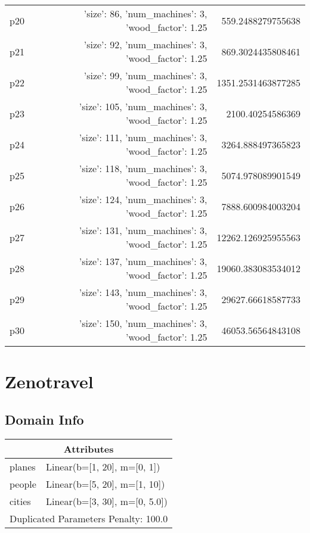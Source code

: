 \documentclass{article}
\begin{document}
\begin{center}
\begin{tabular}{r|r|r}
  p20&{'size': 86, 'num\_machines': 3, 'wood\_factor': 1.25}&559.2488279755638\\
  p21&{'size': 92, 'num\_machines': 3, 'wood\_factor': 1.25}&869.3024435808461\\
  p22&{'size': 99, 'num\_machines': 3, 'wood\_factor': 1.25}&1351.2531463877285\\
  p23&{'size': 105, 'num\_machines': 3, 'wood\_factor': 1.25}&2100.40254586369\\
  p24&{'size': 111, 'num\_machines': 3, 'wood\_factor': 1.25}&3264.888497365823\\
  p25&{'size': 118, 'num\_machines': 3, 'wood\_factor': 1.25}&5074.978089901549\\
  p26&{'size': 124, 'num\_machines': 3, 'wood\_factor': 1.25}&7888.600984003204\\
  p27&{'size': 131, 'num\_machines': 3, 'wood\_factor': 1.25}&12262.126925955563\\
  p28&{'size': 137, 'num\_machines': 3, 'wood\_factor': 1.25}&19060.383083534012\\
  p29&{'size': 143, 'num\_machines': 3, 'wood\_factor': 1.25}&29627.66618587733\\
  p30&{'size': 150, 'num\_machines': 3, 'wood\_factor': 1.25}&46053.56564843108
                            \end{tabular}
                            \end{center}
                    
                            \newpage \section{Zenotravel}
                    \subsection*{Domain Info}

                    \begin{center}
                    \begin{tabular}{p{}p{}}
                    \multicolumn{2}{c}{\bf \large Attributes}\\\midrule
                    planes & Linear(b=[1, 20], m=[0, 1])\\
people & Linear(b=[5, 20], m=[1, 10])\\
cities & Linear(b=[3, 30], m=[0, 5.0])
                    
                     \\\midrule
                    \multicolumn{2}{l}{Duplicated Parameters Penalty: 100.0}
                    \end{tabular}
                    \end{center}
                
\end{document}
